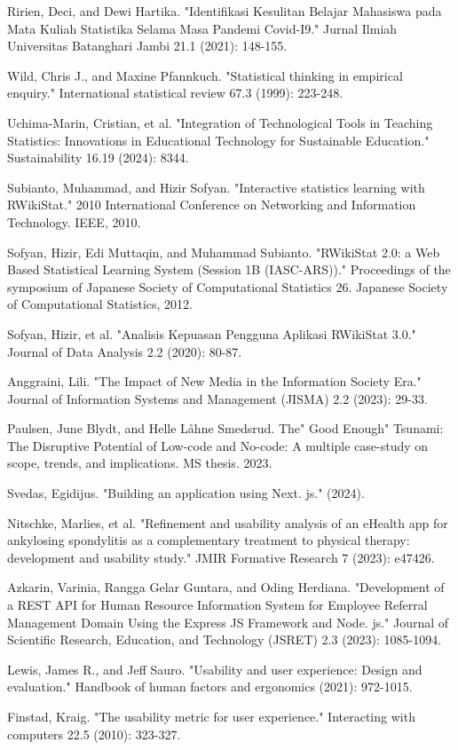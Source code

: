 \documentclass[conference,a4paper]{IEEEtran}
\begin{document}
\begin{thebibliography}{00}

  Ririen, Deci, and Dewi Hartika. "Identifikasi Kesulitan Belajar Mahasiswa pada Mata Kuliah Statistika Selama Masa Pandemi Covid-I9." Jurnal Ilmiah Universitas Batanghari Jambi 21.1 (2021): 148-155.

  Wild, Chris J., and Maxine Pfannkuch. "Statistical thinking in empirical enquiry." International statistical review 67.3 (1999): 223-248.

  Uchima-Marin, Cristian, et al. "Integration of Technological Tools in Teaching Statistics: Innovations in Educational Technology for Sustainable Education." Sustainability 16.19 (2024): 8344.

  Subianto, Muhammad, and Hizir Sofyan. "Interactive statistics learning with RWikiStat." 2010 International Conference on Networking and Information Technology. IEEE, 2010.

  Sofyan, Hizir, Edi Muttaqin, and Muhammad Subianto. "RWikiStat 2.0: a Web Based Statistical Learning System (Session 1B (IASC-ARS))." Proceedings of the symposium of Japanese Society of Computational Statistics 26. Japanese Society of Computational Statistics, 2012.

  Sofyan, Hizir, et al. "Analisis Kepuasan Pengguna Aplikasi RWikiStat 3.0." Journal of Data Analysis 2.2 (2020): 80-87.

  Anggraini, Lili. "The Impact of New Media in the Information Society Era." Journal of Information Systems and Management (JISMA) 2.2 (2023): 29-33.

  Paulsen, June Blydt, and Helle Låhne Smedsrud. The" Good Enough" Tsunami: The Disruptive Potential of Low-code and No-code: A multiple case-study on scope, trends, and implications. MS thesis. 2023.

  Svedas, Egidijus. "Building an application using Next. js." (2024).

  Nitschke, Marlies, et al. "Refinement and usability analysis of an eHealth app for ankylosing spondylitis as a complementary treatment to physical therapy: development and usability study." JMIR Formative Research 7 (2023): e47426.

  Azkarin, Varinia, Rangga Gelar Guntara, and Oding Herdiana. "Development of a REST API for Human Resource Information System for Employee Referral Management Domain Using the Express JS Framework and Node. js." Journal of Scientific Research, Education, and Technology (JSRET) 2.3 (2023): 1085-1094.

  Lewis, James R., and Jeff Sauro. "Usability and user experience: Design and evaluation." Handbook of human factors and ergonomics (2021): 972-1015.

  Finstad, Kraig. "The usability metric for user experience." Interacting with computers 22.5 (2010): 323-327.

\end{thebibliography}
\end{document}
